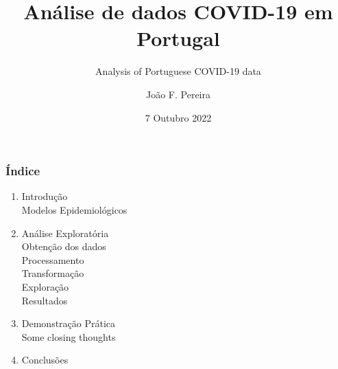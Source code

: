 \documentclass[pdf]
{beamer}
\title{Análise de dados COVID-19 em Portugal}
\subtitle{Analysis of Portuguese COVID-19 data}
\author{João F. Pereira}
\date{7 Outubro 2022}
\begin{document}
	
\begin{frame}
\titlepage
\end{frame}

\begin{frame}
	\frametitle{Índice}
	\begin{enumerate}
		\item Introdução
			\\ \textcolor{ExecusharesGrey}{\footnotesize\hspace{1em }Modelos Epidemiológicos}
		\item Análise Exploratória  
			\\ \textcolor{ExecusharesGrey}{\footnotesize\hspace{1em}Obtenção dos dados}
			\\ \textcolor{ExecusharesGrey}{\footnotesize\hspace{1em}Processamento}
			\\ \textcolor{ExecusharesGrey}{\footnotesize\hspace{1em}Transformação}
			\\ \textcolor{ExecusharesGrey}{\footnotesize\hspace{1em}Exploração}
			\\ \textcolor{ExecusharesGrey}{\footnotesize\hspace{1em}Resultados}
		\item Demonstração Prática \\ \textcolor{ExecusharesGrey}{\footnotesize\hspace{1em} Some closing thoughts}
		\item Conclusões
	\end{enumerate}
\end{frame}
	
\end{document}
